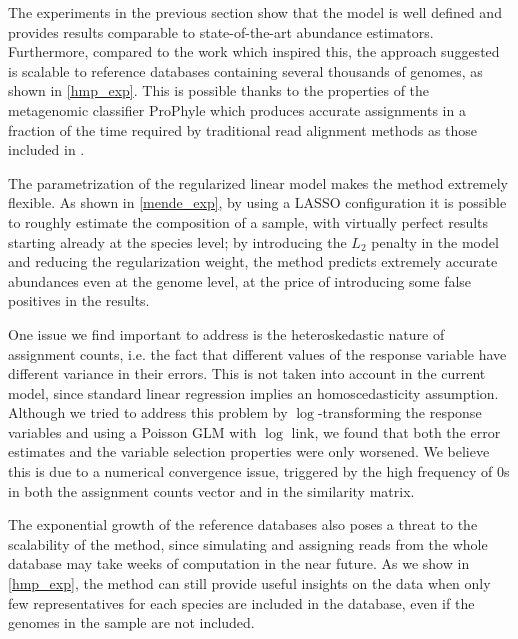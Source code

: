 The experiments in the previous section show that the model is well defined and provides results comparable to state-of-the-art abundance estimators. Furthermore, compared to the work which inspired this\cite{lindner_metagenomic_2013}, the approach suggested is scalable to reference databases containing several thousands of genomes, as shown in \ref{hmp_exp}. This is possible thanks to the properties of the metagenomic classifier ProPhyle which produces accurate assignments in a fraction of the time required by traditional read alignment methods as those included in \cite{lindner_metagenomic_2013}.

The parametrization of the regularized linear model makes the method extremely flexible. As shown in \ref{mende_exp}, by using a LASSO configuration it is possible to roughly estimate the composition of a sample, with virtually perfect results starting already at the species level; by introducing the $L_2$ penalty in the model and reducing the regularization weight, the method predicts extremely accurate abundances even at the genome level, at the price of introducing some false positives in the results.

One issue we find important to address is the heteroskedastic nature of assignment counts, i.e. the fact that different values of the response variable have different variance in their errors. This is not taken into account in the current model, since standard linear regression implies an homoscedasticity assumption. Although we tried to address this problem by $\log$-transforming the response variables and using a Poisson GLM with $\log$ link, we found that both the error estimates and the variable selection properties were only worsened. We believe this is due to a numerical convergence issue, triggered by the high frequency of 0s in both the assignment counts vector and in the similarity matrix.

The exponential growth of the reference databases also poses a threat to the scalability of the method, since simulating and assigning reads from the whole database may take weeks of computation in the near future. As we show in \ref{hmp_exp}, the method can still provide useful insights on the data when only few representatives for each species are included in the database, even if the genomes in the sample are not included.
